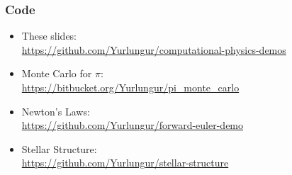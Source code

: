 \documentclass[]{beamer}
\begin{document}
\begin{frame}
  \frametitle{Code}
  \begin{itemize}
  \item These slides:\\ 
    {\small\url{https://github.com/Yurlungur/computational-physics-demos}}
  \item Monte Carlo for $\pi$:\\
    {\small\url{https://bitbucket.org/Yurlungur/pi_monte_carlo}}
  \item Newton's Laws:\\ 
    {\small\url{https://github.com/Yurlungur/forward-euler-demo}}
  \item Stellar Structure:\\ 
    {\small \url{https://github.com/Yurlungur/stellar-structure}}
  \end{itemize}
\end{frame}
\end{document}
